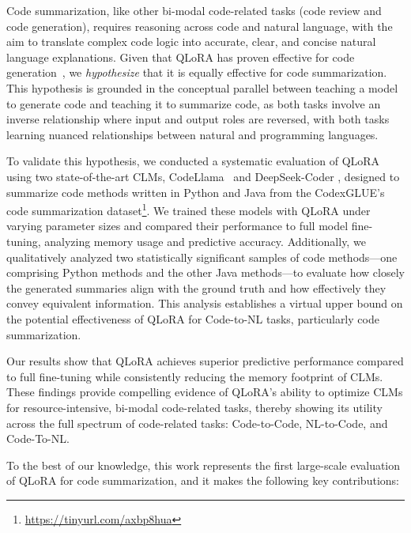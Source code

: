 Code summarization, like other bi-modal code-related tasks (\eg code review and code generation), requires reasoning across code and natural language, with the aim to translate complex code logic into accurate, clear, and concise natural language explanations. Given that QLoRA has proven effective for code generation~\cite{weyssow2023exploring}, we \textit{hypothesize} that it is equally effective for code summarization. This hypothesis is grounded in the conceptual parallel between teaching a model to generate code and teaching it to summarize code, as both tasks involve an inverse relationship where input and output roles are reversed, with both tasks learning nuanced relationships between natural and programming languages.

To validate this hypothesis, we conducted a systematic evaluation of QLoRA using two state-of-the-art CLMs, CodeLlama~\cite{codellama} and DeepSeek-Coder \cite{deepseek}, designed to summarize code methods written in Python and Java from the CodexGLUE's code summarization dataset\footnote{\url{https://tinyurl.com/axbp8hua}}. We trained these models with QLoRA under varying parameter sizes and compared their performance to full model fine-tuning, analyzing memory usage and predictive accuracy. Additionally, we qualitatively analyzed two statistically significant samples of code methods—one comprising Python methods and the other Java methods—to evaluate how closely the generated summaries align with the ground truth and how effectively they convey equivalent information. This analysis establishes a virtual upper bound on the potential effectiveness of QLoRA for Code-to-NL tasks, particularly code summarization.


Our results show that QLoRA achieves superior predictive performance compared to full fine-tuning while consistently reducing the memory footprint of CLMs. These findings provide compelling evidence of QLoRA's ability to optimize CLMs for resource-intensive, bi-modal code-related tasks, thereby showing its utility across the full spectrum of code-related tasks: Code-to-Code, NL-to-Code, and  Code-To-NL.

To the best of our knowledge, this work represents the first large-scale evaluation of QLoRA for code summarization, and it makes the following key contributions:


